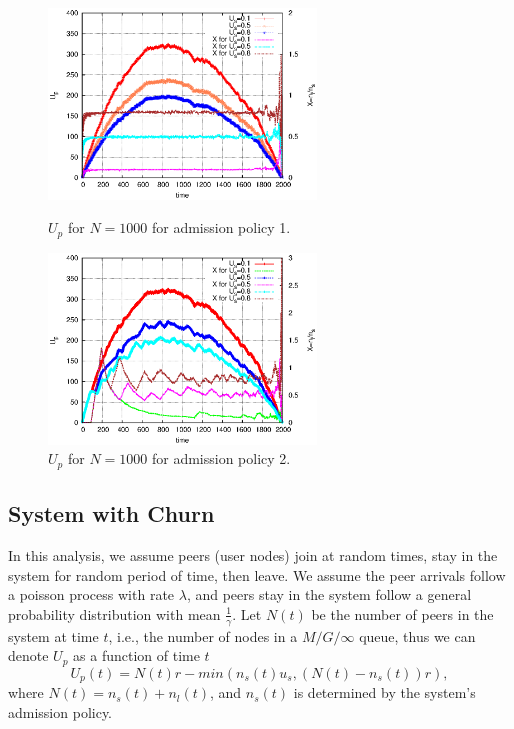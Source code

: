 \documentclass[paper]{ieice}
\begin{document}
\begin{figure}[thb]
\begin{minipage}[b]{0.4\linewidth}
\centering
\includegraphics[width=2.8in]{graphs/U_p_n_1000.eps}
\caption{$U_p$ for $N=1000$ for admission policy 1.}
\label{fig:U_p_1000_1}
\end{minipage}
\hspace{0.5cm}
\begin{minipage}[b]{0.5\linewidth}
\centering
\includegraphics[width=2.8in]{graphs/U_p_n_1000_admi.eps}
\caption{$U_p$ for $N=1000$ for admission policy 2.}
\label{fig:U_p_1000_2}
\end{minipage}
\end{figure}

\subsection{System with Churn}\label{sec:stablesystemwithchurn}

In this analysis, we assume peers (user nodes) join at random times, stay in the system for random period of time, then leave.
We assume the peer arrivals follow a poisson process with rate $\lambda$, and peers stay in the system follow a general probability distribution with mean $\frac{1}{\gamma}$.
Let $N(t)$ be the number of peers in the system at time $t$, i.e., the number of nodes in a $M/G/\infty$ queue, thus we can denote $U_p$ as a function of time $t$
\begin{equation}
        U_p(t) = N(t)r - min(n_s(t)u_s, (N(t)-n_s(t))r),
\end{equation}
where $N(t) = n_s(t) + n_l(t)$, and $n_s(t)$ is determined by the system's admission policy.
\end{document}
